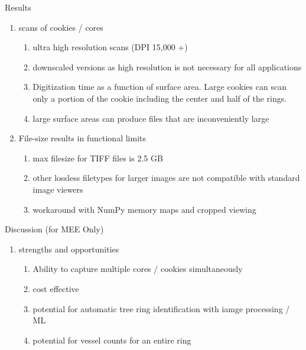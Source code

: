 \documentclass{article}
\begin{document}
\begin{outline}[enumerate]
\item Results
	\begin{enumerate}
	\item scans of cookies / cores
		\begin{enumerate}
		\item ultra high resolution scans (DPI 15,000 +)
		\item downscaled versions as high resolution is not necessary for all applications
		\item Digitization time as a function of surface area. Large cookies can scan only a portion of the cookie including the center and half of the rings.
		\item large surface areas can produce files that are inconveniently large
		\end{enumerate}
	\item File-size results in functional limits 
		\begin{enumerate}
		\item max filesize for TIFF files is 2.5 GB
		\item other lossless filetypes for larger images are not compatible with standard image viewers
		\item workaround with NumPy memory maps and cropped viewing 
		\end{enumerate}
	\end{enumerate}
\item Discussion (for MEE Only) 
	\begin{enumerate}
	\item strengths and opportunities
		\begin{enumerate} %
		\item  Ability to capture multiple cores / cookies simultaneously
		\item cost effective
		\item potential for automatic tree ring identification with iamge processing / ML 
		\item potential for vessel counts for an entire ring 

\end{enumerate}
\end{enumerate}
\end{outline}
\end{document}
